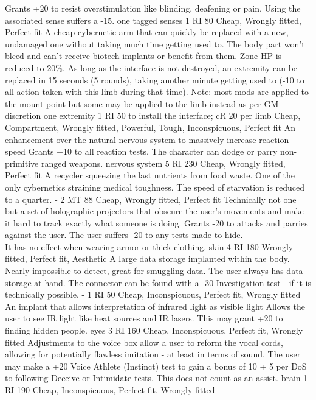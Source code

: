 \begin{multicols}{2}
    {Grants +20 to resist overstimulation like blinding, deafening or pain. Using the associated sense suffers a -15.}
    {one tagged senses}
    {1 RI}
    {80}
    {Cheap, Wrongly fitted, Perfect fit}
    {A cheap cybernetic arm that can quickly be replaced with a new, undamaged one without taking much time getting used to.}
    {The body part won't bleed and can't receive biotech implants or benefit from them.
	   Zone HP is reduced to 20\%. As long as the interface is not destroyed, an extremity can be replaced in 15 seconds (5 rounds), taking another minute getting used to (-10 to all action taken with this limb during that time).
	   Note: most mods are applied to the mount point but some may be applied to the limb instead as per GM discretion}
    {one extremity}
    {1 RI}
    {50 to install the interface; cR 20 per limb}
    {Cheap, Compartment, Wrongly fitted, Powerful, Tough, Inconspicuous, Perfect fit}
    {An enhancement over the natural nervous system to massively increase reaction speed}
    {Grants +10 to all reaction tests. The character can dodge or parry non-primitive ranged weapons.}
    {nervous system}
    {5 RI}
    {230}
    {Cheap, Wrongly fitted, Perfect fit}
    {A recycler squeezing the last nutrients from food waste. One of the only cybernetics straining medical toughness.}
    {The speed of starvation is reduced to a quarter.}
    {-}
    {2 MT}
    {88}
    {Cheap, Wrongly fitted, Perfect fit}
    {Technically not one but a set of holographic projectors that obscure the user's movements and make it hard to track exactly what someone is doing.}
    {Grants -20 to attacks and parries against the user.
       The user suffers -20 to any tests made to hide. \\
	   It has no effect when wearing armor or thick clothing.}
    {skin}
    {4 RI}
    {180}
    {Wrongly fitted, Perfect fit, Aesthetic}
    {A large data storage implanted within the body. Nearly impossible to detect, great for smuggling data.}
    {The user always has data storage at hand. The connector can be found with a -30 Investigation test - if it is technically possible.}
    {-}
    {1 RI}
    {50}
    {Cheap, Inconspicuous, Perfect fit, Wrongly fitted}
    {An implant that allows interpretation of infrared light as visible light}
    {Allows the user to see IR light like heat sources and IR lasers.
        This may grant +20 to finding hidden people.}
    {eyes}
    {3 RI}
    {160}
    {Cheap, Inconspicuous, Perfect fit, Wrongly fitted}
    {Adjustments to the voice box allow a user to reform the vocal cords, allowing for potentially flawless imitation - at least in terms of sound.}
    {The user may make a +20 Voice Athlete (Instinct) test to gain a bonus of 10 + 5 per DoS to following Deceive or Intimidate tests. This does not count as an assist.}
    {brain}
    {1 RI}
    {190}
    {Cheap, Inconspicuous, Perfect fit, Wrongly fitted}
\end{multicols}
